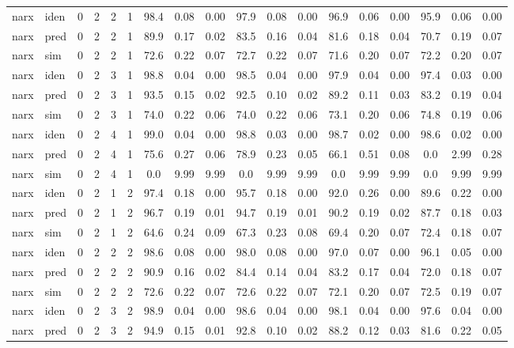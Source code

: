 \begin{landscape}
\begin{center}
\begin{longtable}{ll|cccc|ccc|ccc|ccc|ccc}
 \hline 
narx & iden & 0 & 2 & 2 & 1 & 98.4 & 0.08 & 0.00 & 97.9 & 0.08 & 0.00 & 96.9 & 0.06 & 0.00 & 95.9 & 0.06 & 0.00 \\ 
narx & pred & 0 & 2 & 2 & 1 & 89.9 & 0.17 & 0.02 & 83.5 & 0.16 & 0.04 & 81.6 & 0.18 & 0.04 & 70.7 & 0.19 & 0.07 \\ 
narx & sim  & 0 & 2 & 2 & 1 & 72.6 & 0.22 & 0.07 & 72.7 & 0.22 & 0.07 & 71.6 & 0.20 & 0.07 & 72.2 & 0.20 & 0.07 \\ 
 \hline 
narx & iden & 0 & 2 & 3 & 1 & 98.8 & 0.04 & 0.00 & 98.5 & 0.04 & 0.00 & 97.9 & 0.04 & 0.00 & 97.4 & 0.03 & 0.00 \\ 
narx & pred & 0 & 2 & 3 & 1 & 93.5 & 0.15 & 0.02 & 92.5 & 0.10 & 0.02 & 89.2 & 0.11 & 0.03 & 83.2 & 0.19 & 0.04 \\ 
narx & sim  & 0 & 2 & 3 & 1 & 74.0 & 0.22 & 0.06 & 74.0 & 0.22 & 0.06 & 73.1 & 0.20 & 0.06 & 74.8 & 0.19 & 0.06 \\ 
 \hline 
narx & iden & 0 & 2 & 4 & 1 & 99.0 & 0.04 & 0.00 & 98.8 & 0.03 & 0.00 & 98.7 & 0.02 & 0.00 & 98.6 & 0.02 & 0.00 \\ 
narx & pred & 0 & 2 & 4 & 1 & 75.6 & 0.27 & 0.06 & 78.9 & 0.23 & 0.05 & 66.1 & 0.51 & 0.08 & 0.0 & 2.99 & 0.28 \\ 
narx & sim  & 0 & 2 & 4 & 1 & 0.0 & 9.99 & 9.99 & 0.0 & 9.99 & 9.99 & 0.0 & 9.99 & 9.99 & 0.0 & 9.99 & 9.99 \\ 
 \hline 
narx & iden & 0 & 2 & 1 & 2 & 97.4 & 0.18 & 0.00 & 95.7 & 0.18 & 0.00 & 92.0 & 0.26 & 0.00 & 89.6 & 0.22 & 0.00 \\ 
narx & pred & 0 & 2 & 1 & 2 & 96.7 & 0.19 & 0.01 & 94.7 & 0.19 & 0.01 & 90.2 & 0.19 & 0.02 & 87.7 & 0.18 & 0.03 \\ 
narx & sim  & 0 & 2 & 1 & 2 & 64.6 & 0.24 & 0.09 & 67.3 & 0.23 & 0.08 & 69.4 & 0.20 & 0.07 & 72.4 & 0.18 & 0.07 \\ 
 \hline 
narx & iden & 0 & 2 & 2 & 2 & 98.6 & 0.08 & 0.00 & 98.0 & 0.08 & 0.00 & 97.0 & 0.07 & 0.00 & 96.1 & 0.05 & 0.00 \\ 
narx & pred & 0 & 2 & 2 & 2 & 90.9 & 0.16 & 0.02 & 84.4 & 0.14 & 0.04 & 83.2 & 0.17 & 0.04 & 72.0 & 0.18 & 0.07 \\ 
narx & sim  & 0 & 2 & 2 & 2 & 72.6 & 0.22 & 0.07 & 72.6 & 0.22 & 0.07 & 72.1 & 0.20 & 0.07 & 72.5 & 0.19 & 0.07 \\ 
 \hline 
narx & iden & 0 & 2 & 3 & 2 & 98.9 & 0.04 & 0.00 & 98.6 & 0.04 & 0.00 & 98.1 & 0.04 & 0.00 & 97.6 & 0.04 & 0.00 \\ 
narx & pred & 0 & 2 & 3 & 2 & 94.9 & 0.15 & 0.01 & 92.8 & 0.10 & 0.02 & 88.2 & 0.12 & 0.03 & 81.6 & 0.22 & 0.05 \\ 

\end{longtable}
\end{center}
\end{landscape}
